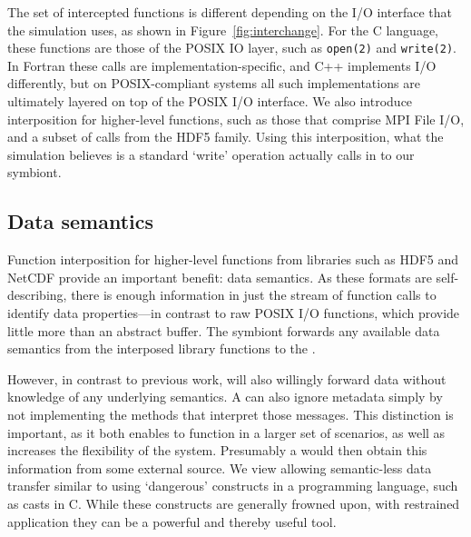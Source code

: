 The set of intercepted functions is different depending on the I/O
interface that the
simulation uses, as shown in Figure~\ref{fig:interchange}.  For the C
language, these functions are those of the POSIX
IO layer, such as \texttt{open(2)} and \texttt{write(2)}.  In Fortran
these calls are implementation-specific, and C++ implements I/O
differently, but on POSIX-compliant systems all such implementations
are ultimately layered on top of the POSIX I/O interface.  We also
introduce interposition for higher-level functions, such as those that
comprise MPI File I/O, and a subset of calls from the HDF5 family.
Using this interposition, what the simulation believes is a standard
`write' operation actually calls in to our symbiont.

\subsection{Data semantics}

Function interposition for higher-level functions from libraries such
as HDF5 and NetCDF provide an important benefit: data semantics.  As
these formats are self-describing, there is enough information in just
the stream of function calls to identify data properties---in contrast
to raw POSIX I/O functions, which provide little more than an abstract
buffer.  The symbiont forwards any available data semantics from the
interposed library functions to the
\freeprocessor{}.

However, in contrast to previous work, \freeprocessing{} will also
willingly forward data without knowledge of any underlying semantics.
A \freeprocessor{} can also ignore metadata simply by not implementing
the methods that interpret those messages.  This distinction is
important, as it both enables \freeprocessing{} to function in a larger
set of scenarios, as well as increases the flexibility of the system.
Presumably a \freeprocessor{} would then obtain this information from
some external source.  We view allowing semantic-less data transfer
similar to using `dangerous' constructs in a programming language, such
as casts in C.  While these constructs are generally
frowned upon, with restrained application they can be a powerful and
thereby useful tool.


